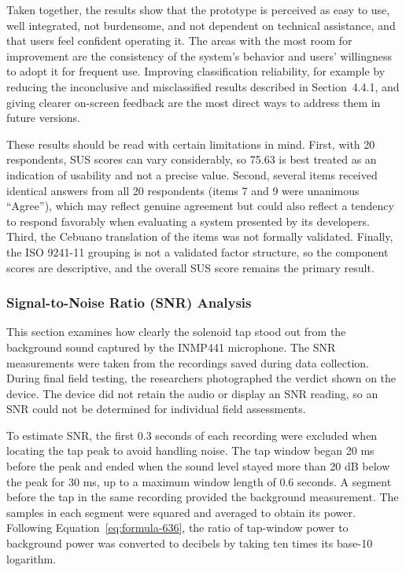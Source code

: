 \begin{thesisprose}
Taken together, the results show that the prototype is perceived as easy to use, well integrated, not burdensome, and not dependent on technical assistance, and that users feel confident operating it. The areas with the most room for improvement are the consistency of the system's behavior and users' willingness to adopt it for frequent use. Improving classification reliability, for example by reducing the inconclusive and misclassified results described in Section~4.4.1, and giving clearer on-screen feedback are the most direct ways to address them in future versions.

These results should be read with certain limitations in mind. First, with 20 respondents, SUS scores can vary considerably, so 75.63 is best treated as an indication of usability and not a precise value. Second, several items received identical answers from all 20 respondents (items 7 and 9 were unanimous ``Agree''), which may reflect genuine agreement but could also reflect a tendency to respond favorably when evaluating a system presented by its developers. Third, the Cebuano translation of the items was not formally validated. Finally, the ISO 9241-11 grouping is not a validated factor structure, so the component scores are descriptive, and the overall SUS score remains the primary result.

\subsubsection{Signal-to-Noise Ratio (SNR) Analysis}

This section examines how clearly the solenoid tap stood out from the background sound captured by the INMP441 microphone. The SNR measurements were taken from the recordings saved during data collection. During final field testing, the researchers photographed the verdict shown on the device. The device did not retain the audio or display an SNR reading, so an SNR could not be determined for individual field assessments.

To estimate SNR, the first 0.3 seconds of each recording were excluded when locating the tap peak to avoid handling noise. The tap window began 20 ms before the peak and ended when the sound level stayed more than 20 dB below the peak for 30 ms, up to a maximum window length of 0.6 seconds. A segment before the tap in the same recording provided the background measurement. The samples in each segment were squared and averaged to obtain its power. Following Equation~\eqref{eq:formula-636}, the ratio of tap-window power to background power was converted to decibels by taking ten times its base-10 logarithm.


\end{thesisprose}

